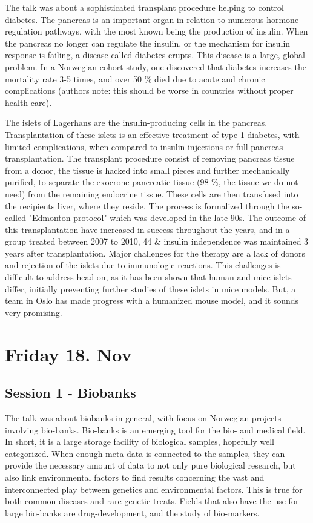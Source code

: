 \documentclass[12p]{article}
\begin{document}
The talk was about a sophisticated transplant procedure helping to control diabetes.
The pancreas is an important organ in relation to numerous hormone regulation pathways, with the most known being the production of insulin.
When the pancreas no longer can regulate the insulin, or the mechanism for insulin response is failing, a disease called diabetes erupts.
This disease is a large, global problem.
In a Norwegian cohort study, one discovered that diabetes increases the mortality rate 3-5 times, and over 50 \% died due to acute and chronic complications (authors note: this should be worse in countries without proper health care).

The islets of Lagerhans are the insulin-producing cells in the pancreas.
Transplantation of these islets is an effective treatment of type 1 diabetes, with limited complications, when compared to insulin injections or full pancreas transplantation.
The transplant procedure consist of removing pancreas tissue from a donor, the tissue is hacked into small pieces and further mechanically purified, to separate the exocrone pancreatic tissue (98 \%, the tissue we do not need) from the remaining endocrine tissue.
These cells are then transfused into the recipients liver, where they reside.
The process is formalized through the so-called "Edmonton protocol" which was developed in the late 90s.
The outcome of this transplantation have increased in success throughout the years, and in a group treated between 2007 to 2010, 44 \& insulin independence was maintained 3 years after transplantation.
Major challenges for the therapy are a lack of donors and rejection of the islets due to immunologic reactions.
This challenges is difficult to address head on, as it has been shown that human and mice islets differ, initially preventing further studies of these islets in mice models.
But, a team in Oslo has made progress with a humanized mouse model, and it sounds very promising. 


\section*{Friday 18. Nov}

\subsection*{Session 1 - Biobanks}

The talk was about biobanks in general, with focus on Norwegian projects involving bio-banks.
Bio-banks is an emerging tool for the bio- and medical field.
In short, it is a large storage facility of biological samples, hopefully well categorized.
When enough meta-data is connected to the samples, they can provide the necessary amount of data to not only pure biological research, but also link environmental factors to find results concerning the vast and interconnected play between genetics and environmental factors.
This is true for both common diseases and rare genetic treats.
Fields that also have the use for large bio-banks are drug-development, and the study of bio-markers.
\end{document}
